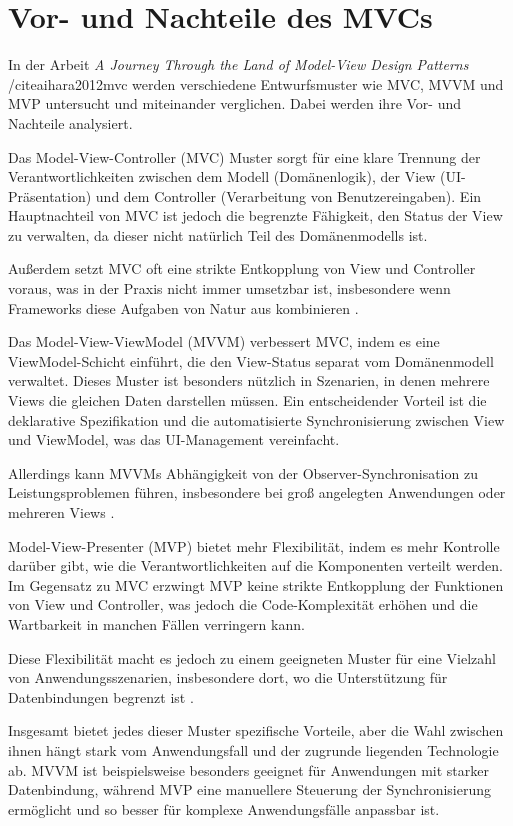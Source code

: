 \chapter{Vor- und Nachteile des MVCs}

In der Arbeit \textit{A Journey Through the Land of 
Model-View Design Patterns} /cite{aihara2012mvc} werden verschiedene 
Entwurfsmuster wie MVC, MVVM und MVP untersucht 
und miteinander verglichen. Dabei werden ihre Vor- und 
Nachteile analysiert.

Das Model-View-Controller (MVC) Muster
sorgt für eine klare Trennung der 
Verantwortlichkeiten zwischen dem Modell 
(Domänenlogik), der View (UI-Präsentation) und dem 
Controller (Verarbeitung von Benutzereingaben). Ein 
Hauptnachteil von MVC ist jedoch die begrenzte 
Fähigkeit, den Status der View zu verwalten, da 
dieser nicht natürlich Teil des Domänenmodells ist. 

Außerdem setzt MVC oft eine strikte Entkopplung von 
View und Controller voraus, was in der Praxis nicht 
immer umsetzbar ist, insbesondere wenn Frameworks 
diese Aufgaben von Natur aus kombinieren 
\cite{aihara2012mvc}.

Das Model-View-ViewModel (MVVM) verbessert MVC, 
indem es eine ViewModel-Schicht einführt, die den 
View-Status separat vom Domänenmodell verwaltet. 
Dieses Muster ist besonders nützlich in Szenarien, 
in denen mehrere Views die gleichen Daten 
darstellen müssen. Ein entscheidender Vorteil ist 
die deklarative Spezifikation und die automatisierte 
Synchronisierung zwischen View und ViewModel, was 
das UI-Management vereinfacht.

Allerdings kann MVVMs Abhängigkeit von der 
Observer-Synchronisation zu Leistungsproblemen 
führen, insbesondere bei groß angelegten 
Anwendungen oder mehreren Views \cite{qureshi2013comparison}.

Model-View-Presenter (MVP) bietet mehr Flexibilität, 
indem es mehr Kontrolle darüber gibt, wie die 
Verantwortlichkeiten auf die Komponenten verteilt 
werden. Im Gegensatz zu MVC erzwingt MVP keine 
strikte Entkopplung der Funktionen von View und 
Controller, was jedoch die Code-Komplexität erhöhen 
und die Wartbarkeit in manchen Fällen verringern 
kann.

Diese Flexibilität macht es jedoch zu einem 
geeigneten Muster für eine Vielzahl von 
Anwendungsszenarien, insbesondere dort, wo die 
Unterstützung für Datenbindungen begrenzt ist 
\cite{aihara2010usability}.

Insgesamt bietet jedes dieser Muster spezifische 
Vorteile, aber die Wahl zwischen ihnen hängt stark 
vom Anwendungsfall und der zugrunde liegenden 
Technologie ab. MVVM ist beispielsweise besonders 
geeignet für Anwendungen mit starker 
Datenbindung, während MVP eine manuellere 
Steuerung der Synchronisierung ermöglicht und so 
besser für komplexe Anwendungsfälle anpassbar ist.
